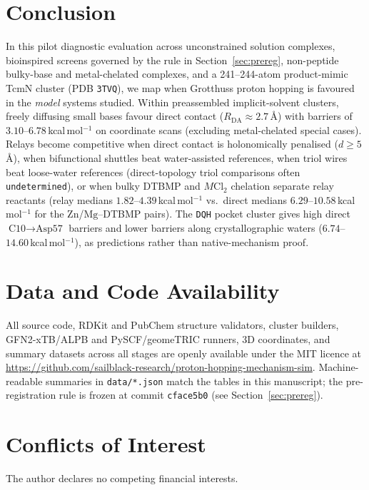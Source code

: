 \documentclass[11pt,a4paper]{article}
\begin{document}
\section{Conclusion}
In this pilot diagnostic evaluation across unconstrained solution complexes, bioinspired screens governed by the rule in Section~\ref{sec:prereg}, non-peptide bulky-base and metal-chelated complexes, and a 241--244-atom product-mimic TcmN cluster (PDB \texttt{3TVQ}), we map when Grotthuss proton hopping is favoured in the \textit{model} systems studied. Within preassembled implicit-solvent clusters, freely diffusing small bases favour direct contact ($R_{\text{DA}} \approx 2.7$\,\AA{}) with barriers of $3.10$--$6.78$\,kcal\,mol$^{-1}$ on coordinate scans (excluding metal-chelated special cases). Relays become competitive when direct contact is holonomically penalised ($d \ge 5$\,\AA{}), when bifunctional shuttles beat water-assisted references, when triol wires beat loose-water references (direct-topology triol comparisons often \texttt{undetermined}), or when bulky DTBMP and $M\text{Cl}_2$ chelation separate relay reactants (relay medians $1.82$--$4.39$\,kcal\,mol$^{-1}$ vs.\ direct medians $6.29$--$10.58$\,kcal\,mol$^{-1}$ for the $\text{Zn}$/$\text{Mg}$--DTBMP pairs). The \texttt{DQH} pocket cluster gives high direct $\text{C10}\to\text{Asp57}$ barriers and lower barriers along crystallographic waters ($6.74$--$14.60$\,kcal\,mol$^{-1}$), as predictions rather than native-mechanism proof.

\section*{Data and Code Availability}
All source code, RDKit and PubChem structure validators, cluster builders, GFN2-xTB/ALPB and PySCF/geomeTRIC runners, 3D coordinates, and summary datasets across all stages are openly available under the MIT licence at \url{https://github.com/sailblack-research/proton-hopping-mechanism-sim}. Machine-readable summaries in \texttt{data/*.json} match the tables in this manuscript; the pre-registration rule is frozen at commit \texttt{cface5b0} (see Section~\ref{sec:prereg}).

\section*{Conflicts of Interest}
The author declares no competing financial interests.
\end{document}
